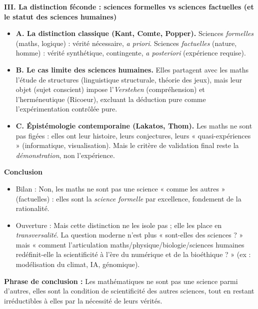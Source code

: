 \documentclass[11pt]{article}
\begin{document}
\begin{exoresolu}
    \textbf{III. La distinction féconde : sciences formelles vs sciences factuelles (et le statut des sciences humaines)}
    \begin{itemize}
        \item \textbf{A. La distinction classique (Kant, Comte, Popper).} Sciences \emph{formelles} (maths, logique) : vérité nécessaire, \emph{a priori}. Sciences \emph{factuelles} (nature, homme) : vérité synthétique, contingente, \emph{a posteriori} (expérience requise).
        \item \textbf{B. Le cas limite des sciences humaines.} Elles partagent avec les maths l'étude de structures (linguistique structurale, théorie des jeux), mais leur objet (sujet conscient) impose l'\emph{Verstehen} (compréhension) et l'herméneutique (Ricoeur), excluant la déduction pure comme l'expérimentation contrôlée pure.
        \item \textbf{C. Épistémologie contemporaine (Lakatos, Thom).} Les maths ne sont pas figées : elles ont leur histoire, leurs conjectures, leurs « quasi-expériences » (informatique, visualisation). Mais le critère de validation final reste la \emph{démonstration}, non l'expérience.
    \end{itemize}

    \textbf{Conclusion}
    \begin{itemize}
        \item Bilan : Non, les maths ne sont pas une science « comme les autres » (factuelles) : elles sont la \emph{science formelle} par excellence, fondement de la rationalité.
        \item Ouverture : Mais cette distinction ne les isole pas ; elle les place en \emph{transversalité}. La question moderne n'est plus « sont-elles des sciences ? » mais « comment l'articulation maths/physique/biologie/sciences humaines redéfinit-elle la scientificité à l'ère du numérique et de la bioéthique ? » (ex : modélisation du climat, IA, génomique).
    \end{itemize}
    \textbf{Phrase de conclusion :} \guillemotleft Les mathématiques ne sont pas une science parmi d'autres, elles sont la condition de scientificité des autres sciences, tout en restant irréductibles à elles par la nécessité de leurs vérités. \guillemotright
\end{exoresolu}
\end{document}
